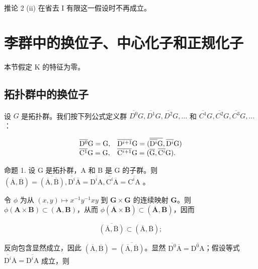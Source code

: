推论 2 (ii) 在省去 I 有限这一假设时不再成立。

\section{李群中的换位子、中心化子和正规化子}

本节假定 K 的特征为零。

\subsection{拓扑群中的换位子}

设 \(G\) 是拓扑群。我们按下列公式定义群 \(\overline{D^0}G, \overline{D^1}G, \overline{D^2}G, \ldots\) 和 \(\overline{C^1}G, \overline{C^2}G, \overline{C^3}G, \ldots\)：

\[
\begin{array}{l l} \overline {{\mathrm{D} ^ {0}}} \mathrm{G} = \mathrm{G}, & \overline {{\mathrm{D} ^ {i + 1}}} \mathrm{G} = (\overline {{\overline {{\mathrm{D} ^ {i}}} \mathrm{G}}}, \overline {{\mathrm{D} ^ {i}}} \mathrm{G}) \\ \overline {{\mathrm{C} ^ {1}}} \mathrm{G} = \mathrm{G}, & \overline {{\mathrm{C} ^ {i + 1}}} \mathrm{G} = (\overline {{\mathrm{G}}}, \overline {{\mathrm{C} ^ {i}}} \mathrm{G}). \end{array}
\]

命题 1. 设 G 是拓扑群，A 和 B 是 G 的子群。则 \((\overline{\mathrm{A}},\overline{\mathrm{B}}) = \overline{(\overline{\mathrm{A}},\overline{\mathrm{B}})},\overline{\mathrm{D}^{i}}\overline{\mathrm{A}} = \overline{\mathrm{D}^{i}\mathrm{A}},\overline{\mathrm{C}^{i}}\overline{\mathrm{A}} = \overline{\mathrm{C}^{i}\mathrm{A}}\) 。

令 \(\phi\) 为从 \((x,y)\mapsto x^{-1}y^{-1}xy\) 到 \(\mathbf{G}\times \mathbf{G}\) 的连续映射 \(\mathbf{G}\)。则 \(\phi (\mathbf{A}\times \mathbf{B})\subset (\mathbf{A},\mathbf{B})\)，从而 \(\phi (\overline{\mathbf{A}}\times \overline{\mathbf{B}})\subset (\overline{\mathbf{A}},\overline{\mathbf{B}})\)，因而

\[
\overline{(\overline{\mathrm{A}},\overline{\mathrm{B}})} \subset (\overline{\mathrm{A}},\overline{\mathrm{B}});
\]

反向包含显然成立，因此 \((\overline{\mathrm{A}},\overline{\mathrm{B}}) = \overline{(\overline{\mathrm{A}},\overline{\mathrm{B}})}\)。显然 \(\overline{\mathrm{D}^{0}}\overline{\mathrm{A}} = \overline{\mathrm{D}^{0}\mathrm{A}}\)；假设等式 \(\overline{\mathrm{D}^{i}}\overline{\mathrm{A}} = \overline{\mathrm{D}^{i}\mathrm{A}}\) 成立，则

